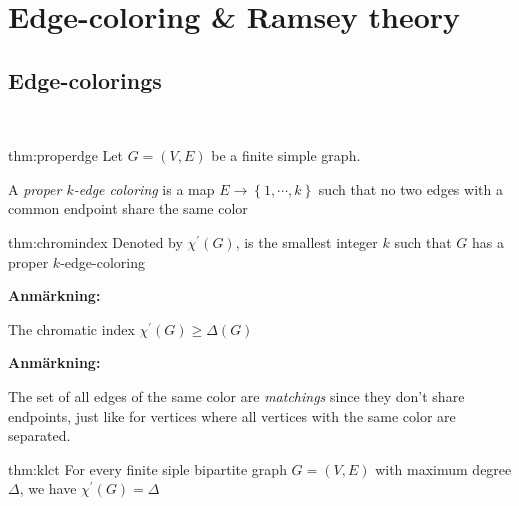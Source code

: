 \section{Edge-coloring \& Ramsey theory}\par
\subsection{Edge-colorings}\hfill\\
\par\bigskip
\begin{theo}{thm:properdge}
  Let $G= (V,E)$ be a finite simple graph.
  \par\bigskip
  \noindent A \textit{proper $k$-edge coloring} is a map $E\to\left\{1,\cdots,k\right\}$ such that no two edges with a common endpoint share the same color
\end{theo}
\par\bigskip
\begin{theo}{thm:chromindex}
  Denoted by $\chi^{\prime}(G)$, is the smallest integer $k$ such that $G$ has a proper $k$-edge-coloring 
\end{theo}
\par\bigskip
\noindent\textbf{Anmärkning:}\par
\noindent The chromatic index $\chi^{\prime}(G)\geq\Delta(G)$
\par\bigskip
\noindent\textbf{Anmärkning:}\par
\noindent The set of all edges of the same color are \textit{matchings} since they don't share endpoints, just like for vertices where all vertices with the same color are separated.
\par\bigskip
\begin{theo}{thm:klct}
  For every finite siple bipartite graph $G = (V,E)$ with maximum degree $\Delta$, we have $\chi^{\prime}(G) = \Delta$
\end{theo}
\par\bigskip
